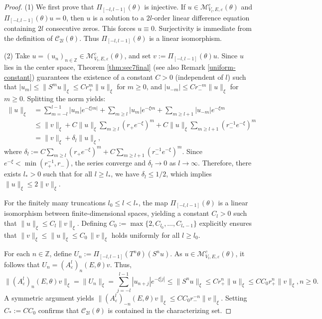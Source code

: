 \documentclass[reqno,11pt]{amsart}
\newcommand{\Z}{{\mathbb Z}}
\begin{document}
\begin{proof}
(1) We first prove that $\Pi_{[-l,l-1]}(\theta)$ is injective. If $u\in \mathcal M_{V_l,E,\varepsilon}^c(\theta)$ and $\Pi_{[-l,l-1]}(\theta) u=0$, then $u$ is a solution to a $2l$-order linear difference equation containing $2l$ consecutive zeros. This forces $u\equiv 0$. Surjectivity is immediate from the definition of $\mathcal C_{2l}(\theta)$. Thus $\Pi_{[-l,l-1]}(\theta)$ is a linear isomorphism.

(2) Take $u=(u_n)_{n\in\Z}\in \mathcal{M}_{V_l,E,\varepsilon}^c(\theta)$, and set $v:=\Pi_{[-l,l-1]}(\theta) u$. Since $u$ lies  in the center space, Theorem \ref{thm:sec7final} (see also Remark \ref{uniform-constant}) guarantees the existence of a constant $C>0$ (independent of $l$) such that $|u_m| \le \|S^m u\|_\xi \le C r_+^m\|u\|_\xi$ for $m \ge 0$, and $|u_{-m}| \le C r_-^{-m}\|u\|_\xi$ for $m \ge 0$. Splitting the norm yields:
$$
\begin{aligned}
\|u\|_{\xi} &= \sum_{m=-l}^{l-1}|u_m|e^{-\xi|m|} + \sum_{m\ge l}|u_m|e^{-\xi m} + \sum_{m\ge l+1}|u_{-m}|e^{-\xi m}\\
&\le \|v\|_{\xi} + C\|u\|_{\xi}\sum_{m\ge l}(r_+e^{-\xi})^m + C\|u\|_{\xi}\sum_{m\ge l+1}(r_-^{-1}e^{-\xi})^m\\
&= \|v\|_{\xi}+\delta_l\|u\|_{\xi},
\end{aligned}
$$
where $\delta_l := C\sum_{m\ge l}(r_+e^{-\xi})^m + C\sum_{m\ge l+1}(r_-^{-1}e^{-\xi})^m$. Since $e^{-\xi} < \min(r_+^{-1}, r_-)$, the series converge and $\delta_l \to 0$ as $l \to \infty$. Therefore, there exists $l_*>0$ such that for all $l\geq l_*$, we have $\delta_l \le 1/2$, which implies $\|u\|_{\xi}\leq 2 \|v\|_{\xi}$.

For the finitely many truncations $l_0\leq l<l_*$, the map $\Pi_{[-l,l-1]}(\theta)$ is a linear isomorphism between finite-dimensional spaces, yielding a constant $C_l>0$ such that $\|u\|_{\xi}\le C_l\|v\|_{\xi}$. Defining $C_0:=\max\{2, C_{l_0},\dots,C_{l_*-1}\}$ explicitly ensures that 
$
\|v\|_{\xi} \leq  \|u\|_{\xi} \le C_0\,\|v\|_{\xi}
$
holds uniformly for all $l\ge l_0$.

For each $n\in\Z$, define $U_n:= \Pi_{[-l,l-1]}(T^n\theta)(S^n u)$. As $u \in \mathcal{M}_{V_l,E,\varepsilon}^c(\theta)$,  it follows that  $U_n = (A^{l}_\varepsilon)_{n}(E,\theta)v$. Thus,
$$
\|(A_\varepsilon^l)_n(E,\theta)v\|_{\xi} = \|U_n\|_{\xi} = \sum_{j=-l}^{l-1}|u_{n+j}|e^{-\xi|j|} \le \|S^n u\|_{\xi} \le C r_+^n\|u\|_{\xi} \leq C C_0 r_+^n\|v\|_{\xi},  n\ge0.
$$
A symmetric argument yields $\|(A_\varepsilon^l)_{-n}(E,\theta)v\|_{\xi} \le C C_0 r_-^{-n}\|v\|_{\xi}$. Setting $C_* := C C_0$ confirms that $\mathcal C_{2l}(\theta)$ is contained in the characterizing set.


\end{proof}
\end{document}
